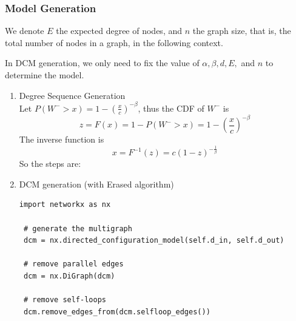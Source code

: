\documentclass{article}
\begin{document}
\subsubsection{Model Generation}
\par We denote $E$ the expected degree of nodes, and $n$  the graph size, that is, the total number of nodes in a graph, in the following context.
\par In DCM generation, we only need to fix the value of $\alpha, \beta, d, E,$ and $n$ to determine the model.

\begin{enumerate}
\item Degree Sequence Generation \\
Let  $P(W^- > x) = 1-(\frac{x}{c})^{- \beta}$, thus the CDF of  $W^-$ is
$$z=F(x) =1-P(W^->x)=1-(\frac{x}{c})^{-\beta}$$
The inverse function is
$$ x=F^{-1}(z)=c(1-z)^{-\frac{1}{\beta}}$$
So the steps are:

\item DCM generation (with Erased algorithm)
\begin{lstlisting}
import networkx as nx
 
 # generate the multigraph
 dcm = nx.directed_configuration_model(self.d_in, self.d_out)

 # remove parallel edges
 dcm = nx.DiGraph(dcm)
            
 # remove self-loops
 dcm.remove_edges_from(dcm.selfloop_edges())
\end{lstlisting}

\end{enumerate} 
\end{document}
